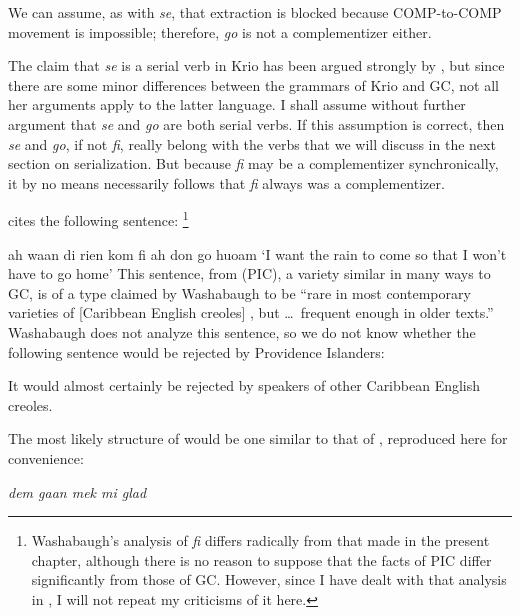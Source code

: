\z
We can assume, as with \textit{se}, that extraction is blocked because COMP-to-COMP movement is impossible; therefore, \textit{go} is not a complementizer either.

The claim that \textit{se} is a serial verb in Krio has been argued strongly by \citet{Larimore1976}, but since there are some minor differences between the grammars of Krio and GC, not all her arguments apply to the latter language. I shall assume without further argument that \textit{se} and \textit{go} are both serial verbs. If this assumption is correct, then \textit{se} and \textit{go}, if not \textit{fi}, really belong with the verbs that we will discuss in the next section on serialization. But because \textit{fi} may be a complementizer synchronically, it by no means necessarily follows that \textit{fi} always was a complementizer.

\citet[Example 9]{Washabaugh1979} cites the following sentence: \footnote{Washabaugh's analysis of \textit{fi} differs radically from that made in the present chapter, although there is no reason to suppose that the facts of PIC differ significantly from those of GC. However, since I have dealt with that analysis in \citet{Bickerton1980}, I will not repeat my criticisms of it here.}

\ea\label{ex:2:220}
ah waan di rien kom fi ah don go huoam
\glt `I want the rain to come so that I won't have to go home'
\z
This sentence, from  (PIC), a variety similar in many ways to GC, is of a type claimed by Washabaugh to be ``rare in most contemporary varieties of [Caribbean English creoles] , but \ldots~frequent enough in older texts.'' Washabaugh does not analyze this sentence, so we do not know whether the following sentence would be rejected by Providence Islanders:

\z
It would almost certainly be rejected by speakers of other Caribbean English creoles.

The most likely structure of  would be one similar to that of , reproduced here for convenience: 

\begin{exe}
 \textit{dem gaan mek mi glad}
\end{exe}

